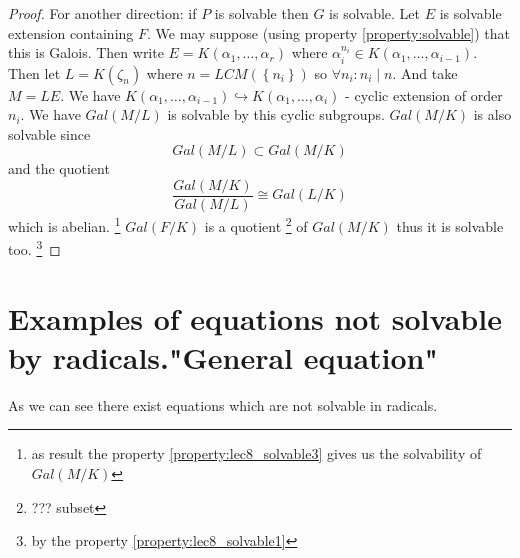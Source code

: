 \begin{theorem}
\begin{proof}
    For another direction: if $P$ is solvable then $G$ is
    solvable. Let $E$ is solvable extension containing $F$. We may
    suppose (using property \ref{property:solvable}) that this is Galois.
    Then write
    $E = K\left(\alpha_1, \dots, \alpha_r\right)$ where
    $\alpha_i^{n_i} \in K\left(\alpha_1, \dots,
    \alpha_{i-1}\right)$. Then let $L = K\left(\zeta_n\right)$
    where $n = LCM\left(\left\{n_i\right\}\right)$ so
    $\forall n_i: n_i \mid n$. And
    take $M = LE$. We have
    $K\left(\alpha_1, \dots, \alpha_{i-1}\right) \hookrightarrow
    K\left(\alpha_1, \dots, \alpha_i\right)$ - cyclic extension of
    order $n_i$. We have $Gal\left(M/L\right)$ is solvable by this
    cyclic subgroups. $Gal\left(M/K\right)$ is also solvable since
    \[
    Gal\left(M/L\right) \subset Gal\left(M/K\right)
    \]
    and the quotient
    \[
    \frac{Gal\left(M/K\right)}{Gal\left(M/L\right)}
    \cong Gal\left(L/K\right)
    \]
    which is abelian.
    \footnote{
      as result the property \ref{property:lec8_solvable3} gives us
      the solvability of $Gal\left(M/K\right)$
    }
    $Gal\left(F/K\right)$ is a quotient
    \footnote{
      ??? subset
    }
    of $Gal\left(M/K\right)$ thus
    it is solvable too.
    \footnote{
      by the property \ref{property:lec8_solvable1}
    }    
  \end{proof}
  \label{thm:lec8_1}
\end{theorem}

\section{Examples of equations not solvable by radicals."General
  equation"}
As we can see there exist equations which are not solvable in
radicals.

